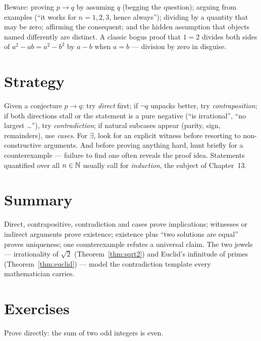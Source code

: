 \begin{notebox}
Beware: proving $p \to q$ by assuming $q$ (begging the question); arguing
from examples (``it works for $n = 1,2,3$, hence always''); dividing by a
quantity that may be zero; affirming the consequent; and the hidden
assumption that objects named differently are distinct. A classic bogus
proof that $1 = 2$ divides both sides of $a^2 - ab = a^2 - b^2$ by $a - b$
when $a = b$ --- division by zero in disguise.
\end{notebox}

\section{Strategy}

Given a conjecture $p \to q$: try \emph{direct} first; if $\neg q$ unpacks
better, try \emph{contraposition}; if both directions stall or the statement
is a pure negative (``is irrational'', ``no largest \ldots''), try
\emph{contradiction}; if natural subcases appear (parity, sign, remainders),
use \emph{cases}. For $\exists$, look for an explicit witness before
resorting to non-constructive arguments. And before proving anything hard,
hunt briefly for a counterexample --- failure to find one often reveals the
proof idea. Statements quantified over all $n \in \mathbb{N}$ usually call for
\emph{induction}, the subject of Chapter~13.

\section{Summary}

Direct, contrapositive, contradiction and cases prove implications;
witnesses or indirect arguments prove existence; existence plus
``two solutions are equal'' proves uniqueness; one counterexample refutes a
universal claim. The two jewels --- irrationality of $\sqrt2$
(Theorem~\ref{thm:sqrt2}) and Euclid's infinitude of primes
(Theorem~\ref{thm:euclid}) --- model the contradiction template every
mathematician carries.

\section*{Exercises}

\begin{exercise}{\easy}
Prove directly: the sum of two odd integers is even.
\end{exercise}

